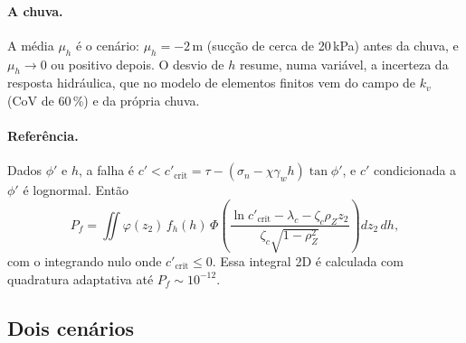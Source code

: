 \documentclass[11pt,a4paper]{article}
\begin{document}
\paragraph{A chuva.} A média $\mu_h$ é o cenário: $\mu_h = -2$\,m (sucção de cerca de 20\,kPa) antes da chuva, e
$\mu_h \to 0$ ou positivo depois. O desvio de $h$ resume, numa variável, a incerteza da resposta hidráulica, que no
modelo de elementos finitos vem do campo de $k_v$ (CoV de 60\,\%) e da própria chuva.

\paragraph{Referência.} Dados $\phi'$ e $h$, a falha é $c' < c'_{\mathrm{crit}} = \tau - (\sigma_n - \chi\gamma_w
h)\tan\phi'$, e $c'$ condicionada a $\phi'$ é lognormal. Então
\[
  P_f = \iint \varphi(z_2)\, f_h(h)\,
  \Phi\!\left(\frac{\ln c'_{\mathrm{crit}} - \lambda_c - \zeta_c \rho_Z z_2}{\zeta_c\sqrt{1 - \rho_Z^2}}\right)
  dz_2\, dh ,
\]
com o integrando nulo onde $c'_{\mathrm{crit}} \leq 0$. Essa integral 2D é calculada com quadratura adaptativa até
$P_f \sim 10^{-12}$.

\subsection{Dois cenários}
\label{sec:cenarios}

\begin{table}[H]
\centering\small
\caption{Problema 2: os cenários antes (A) e depois (B) da chuva. CoV para Monte Carlo e importância; erro de $P_f$
  para o FORM.}
\label{tab:cenarios}

\end{table}
\end{document}
